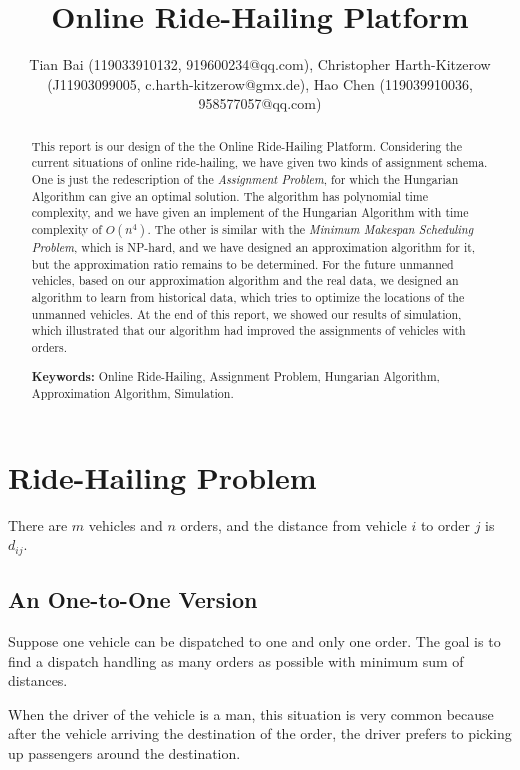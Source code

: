 \documentclass{llncs}
\title{Online Ride-Hailing Platform}
\author{Tian Bai (119033910132, 919600234@qq.com), Christopher Harth-Kitzerow (J11903099005, c.harth-kitzerow@gmx.de), Hao Chen (119039910036, 958577057@qq.com)}
\institute{Department of Computer Science, \\ Shanghai Jiao Tong University, Shanghai, China}
\begin{document}



\maketitle
\begin{abstract}\vspace{-5mm}
This report is our design of the the Online Ride-Hailing Platform. Considering the current situations of online ride-hailing, we have given two kinds of assignment schema. One is just the redescription of the \textit{Assignment Problem}, for which the Hungarian Algorithm can give an optimal solution. The algorithm has polynomial time complexity, and we have given an implement of the Hungarian Algorithm with time complexity of $O(n^4)$. The other is similar with the \textit{Minimum Makespan Scheduling Problem}, which is NP-hard, and we have designed an approximation algorithm for it, but the approximation ratio remains to be determined. For the future unmanned vehicles, based on our approximation algorithm and the real data, we designed an algorithm to learn from historical data, which tries to optimize the locations of the unmanned vehicles. At the end of this report, we showed our results of simulation, which illustrated that our algorithm had improved the assignments of vehicles with orders.

\textbf{Keywords:} Online Ride-Hailing, Assignment Problem, Hungarian Algorithm, Approximation Algorithm, Simulation.
\end{abstract}

\section{Ride-Hailing Problem}
There are $m$ vehicles and $n$ orders, and the distance from vehicle $i$ to order $j$ is $d_{ij}$.

\subsection{An One-to-One Version}
Suppose one vehicle can be dispatched to one and only one order. The goal is to find a dispatch handling as many orders as possible with minimum sum of distances.

When the driver of the vehicle is a man, this situation is very common because after the vehicle arriving the destination of the order, the driver prefers to picking up passengers around the destination.
\end{document}
